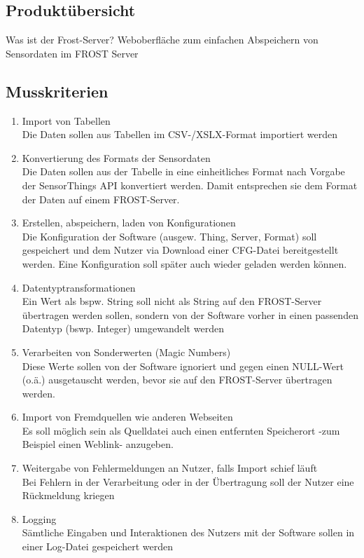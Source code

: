 \documentclass[12 pt]{article}
\begin{document}
\subsection{Produktübersicht}
Was ist der Frost-Server?
Weboberfläche zum einfachen Abspeichern von Sensordaten im FROST Server

\subsection{Musskriterien}
\begin{enumerate}
\item Import von Tabellen \\
	Die Daten sollen aus Tabellen im CSV-/XSLX-Format importiert werden
\item Konvertierung des Formats der Sensordaten \\
	Die Daten sollen aus der Tabelle in eine einheitliches Format nach Vorgabe der SensorThings API konvertiert werden. Damit entsprechen sie dem Format der Daten auf einem FROST-Server.
\item Erstellen, abspeichern, laden von Konfigurationen \\
	Die Konfiguration der Software (ausgew. Thing, Server, Format) soll gespeichert und dem Nutzer via Download einer CFG-Datei bereitgestellt werden. Eine Konfiguration soll später auch wieder geladen werden können.
\item Datentyptransformationen \\
	Ein Wert als bspw. String soll nicht als String auf den FROST-Server übertragen werden sollen, sondern von der Software vorher in einen passenden Datentyp (bswp. Integer) umgewandelt werden
\item Verarbeiten von Sonderwerten (Magic Numbers) \\
	Diese Werte sollen von der Software ignoriert und gegen einen NULL-Wert (o.ä.) ausgetauscht werden, bevor sie auf den FROST-Server übertragen werden.
\item Import von Fremdquellen wie anderen Webseiten \\
	Es soll möglich sein als Quelldatei auch einen entfernten Speicherort -zum Beispiel einen Weblink- anzugeben.
\item Weitergabe von Fehlermeldungen an Nutzer, falls Import schief läuft \\
	Bei Fehlern in der Verarbeitung oder in der Übertragung soll der Nutzer eine Rückmeldung kriegen
\item Logging \\
	Sämtliche Eingaben und Interaktionen des Nutzers mit der Software sollen in einer Log-Datei gespeichert werden
\end{enumerate}
\end{document}
